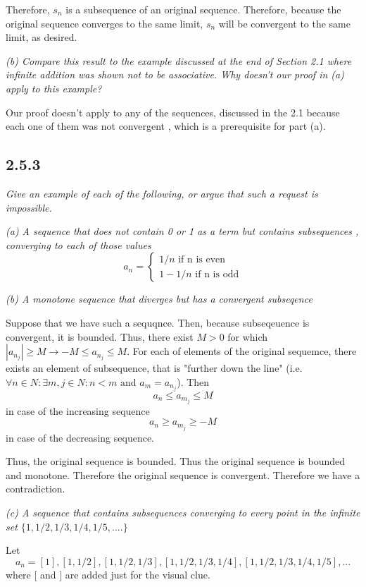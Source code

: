 \documentclass[11pt,oneside,titlepage]{book}
\begin{document}
Therefore, $s_n$ is a subsequence of an original sequence. 
Therefore, because the original sequence converges to the same limit,
$s_n$ will be convergent to the same limit, as desired.

\textit{(b) Compare this result to the example discussed at the end of Section
  2.1 where infinite addition was shown not to be associative. Why doesn't
  our proof in (a) apply to this example?}

Our proof doesn't apply to any of the sequences, discussed in the 2.1
because each one  of them was not convergent , which is a
prerequisite for part (a).

\subsection*{2.5.3}
\textit{Give an example of each of the following, or argue that such a request
  is impossible.}

\textit{(a) A sequence that does not contain 0 or 1 as a term but contains
  subsequences , converging to each of those values}
\begin{equation}
  a_n =
  \begin{cases}
    1/n \text{ if n is even} \\
    1 - 1/n \text{ if n is odd}
  \end{cases}
\end{equation}

\textit{(b) A monotone sequence that diverges but has a convergent subseqence}

Suppose that we have such a sequqnce. Then, because  subseqeuence is
convergent, it is bounded. Thus, there exist $M > 0$ for which
$ |a_{n_j}| \geq M \to -M \leq a_{n_j} \leq M$. For each of elements
of the original sequemce, there exists an element of subsequence,
that is "further down the line" (i.e.
$\forall n \in N: \exists m, j \in N: n < m \text{ and } a_m =
a_{n_j}$). Then
$$a_n \leq a_{m_j} \leq M$$
in case of the increasing sequence
$$a_n \geq a_{m_j} \geq -M$$
in case of the decreasing sequence.

Thus, the original sequence is bounded. Thus the original sequence is bounded
and monotone. Therefore the original sequence is convergent. Therefore
we have a contradiction.

\textit{(c) A sequence that contains subsequences converging to every point
  in the infinite set $\{1, 1/2, 1/3, 1/4, 1/5, ....\}$}

Let
$$a_n = [1], [1, 1/2], [1, 1/2, 1/3], [1, 1/2, 1/3, 1/4], [1, 1/2, 1/3, 1/4, 1/5], ...$$
where $[$ and $]$ are added just for the visual clue.
\end{document}
